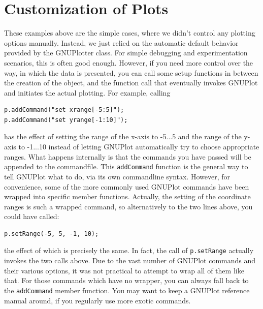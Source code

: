 \documentclass[11pt]{article}
\begin{document}
\section{Customization of Plots}
These examples above are the simple cases, where we didn't control any plotting options manually. Instead, we just relied on the automatic default behavior provided by the GNUPlotter class. For simple debugging and experimentation scenarios, this is often good enough. However, if you need more control over the way, in which the data is presented, you can call some setup functions in between the creation of the object, and the function call that eventually invokes GNUPlot and initiates the actual plotting. For example, calling
\begin{verbatim}
p.addCommand("set xrange[-5:5]");
p.addCommand("set yrange[-1:10]");
\end{verbatim}
has the effect of setting the range of the x-axis to -5...5 and the range of the y-axis to -1...10 instead of letting GNUPlot automatically try to choose appropriate ranges. What happens internally is that the commands you have passed will be appended to the commandfile. This \texttt{addCommand} function is the general way to tell GNUPlot what to do, via its own commandline syntax. However, for convenience, some of the more commonly used GNUPlot commands have been wrapped into specific member functions. Actually, the setting of the coordinate ranges is such a wrapped command, so alternatively to the two lines above, you could have called:
\begin{verbatim}
p.setRange(-5, 5, -1, 10);
\end{verbatim}
the effect of which is precisely the same. In fact, the call of \texttt{p.setRange} actually invokes the two calls above. Due to the vast number of GNUPlot commands and their various options, it was not practical to attempt to wrap all of them like that. For those commands which have no wrapper, you can always fall back to the \texttt{addCommand} member function. You may want to keep a GNUPlot reference manual around, if you regularly use more exotic commands.
\end{document}
